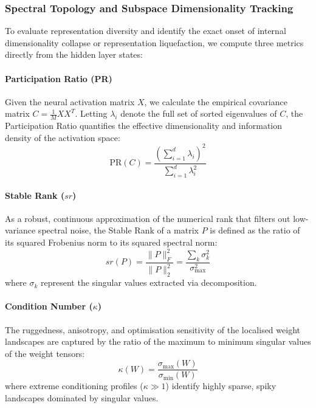 \documentclass[10pt,a4paper]{article}
\begin{document}
	\subsubsection{Spectral Topology and Subspace Dimensionality Tracking}
	To evaluate representation diversity and identify the exact onset of internal dimensionality collapse or representation liquefaction, we compute three metrics directly from the hidden layer states:
	
	\paragraph{Participation Ratio (PR)} 
	Given the neural activation matrix $X$, we calculate the empirical covariance matrix $C = \frac{1}{M}XX^T$. Letting $\lambda_i$ denote the full set of sorted eigenvalues of $C$, the Participation Ratio quantifies the effective dimensionality and information density of the activation space:
	\begin{equation}
		\text{PR}(C) = \frac{\left( \sum_{i=1}^d \lambda_i \right)^2}{\sum_{i=1}^d \lambda_i^2}
	\end{equation}
	
	\paragraph{Stable Rank ($sr$)} 
	As a robust, continuous approximation of the numerical rank that filters out low-variance spectral noise, the Stable Rank of a matrix $P$ is defined as the ratio of its squared Frobenius norm to its squared spectral norm:
	\begin{equation}
		sr(P) = \frac{\|P\|_F^2}{\|P\|_2^2} = \frac{\sum_{k} \sigma_k^2}{\sigma_{\max}^2}
	\end{equation}
	where $\sigma_k$ represent the singular values extracted via decomposition.
	
	\paragraph{Condition Number ($\kappa$)} 
	The ruggedness, anisotropy, and optimisation sensitivity of the localised weight landscapes are captured by the ratio of the maximum to minimum singular values of the weight tensors:
	\begin{equation}
		\kappa(W) = \frac{\sigma_{\max}(W)}{\sigma_{\min}(W)}
	\end{equation}
	where extreme conditioning profiles ($\kappa \gg 1$) identify highly sparse, spiky landscapes dominated by singular values.
	
\end{document}

